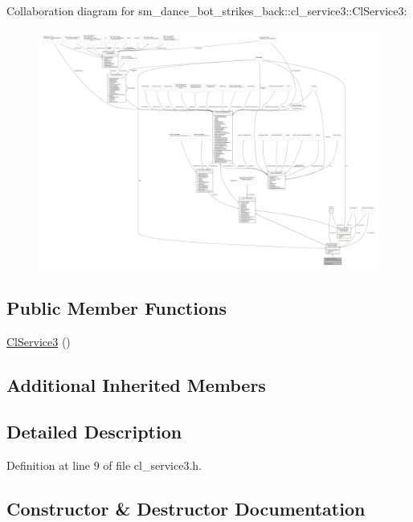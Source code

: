 Collaboration diagram for sm\+\_\+dance\+\_\+bot\+\_\+strikes\+\_\+back\+:\+:cl\+\_\+service3\+:\+:Cl\+Service3\+:
\nopagebreak
\begin{figure}[H]
\begin{center}
\leavevmode
\includegraphics[width=350pt]{classsm__dance__bot__strikes__back_1_1cl__service3_1_1ClService3__coll__graph}
\end{center}
\end{figure}
\subsection*{Public Member Functions}
\begin{DoxyCompactItemize}
\item 
\hyperlink{classsm__dance__bot__strikes__back_1_1cl__service3_1_1ClService3_ad9e03caf3a70440db5e11d7f7c63c502}{Cl\+Service3} ()
\end{DoxyCompactItemize}
\subsection*{Additional Inherited Members}


\subsection{Detailed Description}


Definition at line 9 of file cl\+\_\+service3.\+h.



\subsection{Constructor \& Destructor Documentation}
\mbox{\label{classsm__dance__bot__strikes__back_1_1cl__service3_1_1ClService3_ad9e03caf3a70440db5e11d7f7c63c502}} 

